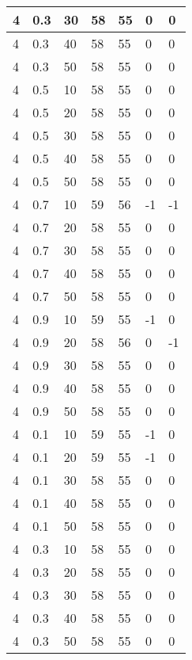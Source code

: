 \begin{longtable}{|l|l|l|l|l|l|l|}
		4     & 0.3 & 30   & 58 & 55 & 0   & 0   \\ \hline
		4     & 0.3 & 40   & 58 & 55 & 0   & 0   \\ \hline
		4     & 0.3 & 50   & 58 & 55 & 0   & 0   \\ \hline
		4     & 0.5 & 10   & 58 & 55 & 0   & 0   \\ \hline
		4     & 0.5 & 20   & 58 & 55 & 0   & 0   \\ \hline
		4     & 0.5 & 30   & 58 & 55 & 0   & 0   \\ \hline
		4     & 0.5 & 40   & 58 & 55 & 0   & 0   \\ \hline
		4     & 0.5 & 50   & 58 & 55 & 0   & 0   \\ \hline
		4     & 0.7 & 10   & 59 & 56 & -1  & -1  \\ \hline
		4     & 0.7 & 20   & 58 & 55 & 0   & 0   \\ \hline
		4     & 0.7 & 30   & 58 & 55 & 0   & 0   \\ \hline
		4     & 0.7 & 40   & 58 & 55 & 0   & 0   \\ \hline
		4     & 0.7 & 50   & 58 & 55 & 0   & 0   \\ \hline
		4     & 0.9 & 10   & 59 & 55 & -1  & 0   \\ \hline
		4     & 0.9 & 20   & 58 & 56 & 0   & -1  \\ \hline
		4     & 0.9 & 30   & 58 & 55 & 0   & 0   \\ \hline
		4     & 0.9 & 40   & 58 & 55 & 0   & 0   \\ \hline
		4     & 0.9 & 50   & 58 & 55 & 0   & 0   \\ \hline
		4     & 0.1 & 10   & 59 & 55 & -1  & 0   \\ \hline
		4     & 0.1 & 20   & 59 & 55 & -1  & 0   \\ \hline
		4     & 0.1 & 30   & 58 & 55 & 0   & 0   \\ \hline
		4     & 0.1 & 40   & 58 & 55 & 0   & 0   \\ \hline
		4     & 0.1 & 50   & 58 & 55 & 0   & 0   \\ \hline
		4     & 0.3 & 10   & 58 & 55 & 0   & 0   \\ \hline
		4     & 0.3 & 20   & 58 & 55 & 0   & 0   \\ \hline
		4     & 0.3 & 30   & 58 & 55 & 0   & 0   \\ \hline
		4     & 0.3 & 40   & 58 & 55 & 0   & 0   \\ \hline
		4     & 0.3 & 50   & 58 & 55 & 0   & 0   \\ \hline

\end{longtable}
